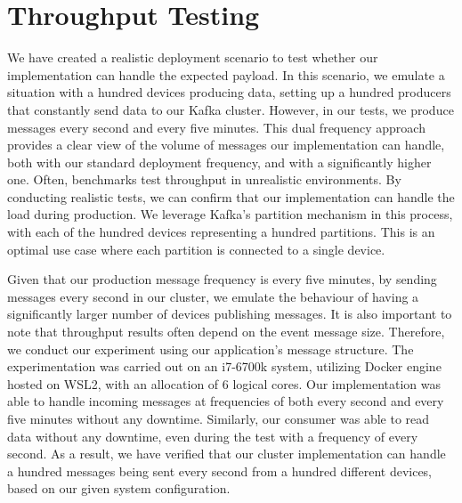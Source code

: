 \section{Throughput Testing}

We have created a realistic deployment scenario to test whether our implementation can handle the expected payload. In this scenario, we emulate a situation with a hundred devices producing data, setting up a hundred producers that constantly send data to our Kafka cluster. However, in our tests, we produce messages every second and every five minutes. This dual frequency approach provides a clear view of the volume of messages our implementation can handle, both with our standard deployment frequency, and with a significantly higher one.
Often, benchmarks test throughput in unrealistic environments. By conducting realistic tests, we can confirm that our implementation can handle the load during production. We leverage Kafka's partition mechanism in this process, with each of the hundred devices representing a hundred partitions. This is an optimal use case where each partition is connected to a single device.

Given that our production message frequency is every five minutes, by sending messages every second in our cluster, we emulate the behaviour of having a significantly larger number of devices publishing messages. It is also important to note that throughput results often depend on the event message size. 
Therefore, we conduct our experiment using our application's message structure. The experimentation was carried out on an i7-6700k system, utilizing Docker engine hosted on WSL2, with an allocation of 6 logical cores. Our implementation was able to handle incoming messages at frequencies of both every second and every five minutes without any downtime. Similarly, our consumer was able to read data without any downtime, even during the test with a frequency of every second. As a result, we have verified that our cluster implementation can handle a hundred messages being sent every second from a hundred different devices, based on our given system configuration.